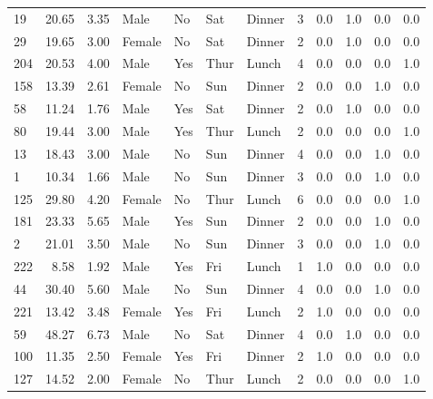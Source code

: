 \documentclass[
  letterpaper,
  DIV=11,
  numbers=noendperiod]{scrreprt}
\begin{document}
\begin{tabular}{lrrllllrrrrr}
19  &       20.65 &  3.35 &    Male &     No &   Sat &  Dinner &     3 &      0.0 &      1.0 &      0.0 &       0.0 \\
29  &       19.65 &  3.00 &  Female &     No &   Sat &  Dinner &     2 &      0.0 &      1.0 &      0.0 &       0.0 \\
204 &       20.53 &  4.00 &    Male &    Yes &  Thur &   Lunch &     4 &      0.0 &      0.0 &      0.0 &       1.0 \\
158 &       13.39 &  2.61 &  Female &     No &   Sun &  Dinner &     2 &      0.0 &      0.0 &      1.0 &       0.0 \\
58  &       11.24 &  1.76 &    Male &    Yes &   Sat &  Dinner &     2 &      0.0 &      1.0 &      0.0 &       0.0 \\
80  &       19.44 &  3.00 &    Male &    Yes &  Thur &   Lunch &     2 &      0.0 &      0.0 &      0.0 &       1.0 \\
13  &       18.43 &  3.00 &    Male &     No &   Sun &  Dinner &     4 &      0.0 &      0.0 &      1.0 &       0.0 \\
1   &       10.34 &  1.66 &    Male &     No &   Sun &  Dinner &     3 &      0.0 &      0.0 &      1.0 &       0.0 \\
125 &       29.80 &  4.20 &  Female &     No &  Thur &   Lunch &     6 &      0.0 &      0.0 &      0.0 &       1.0 \\
181 &       23.33 &  5.65 &    Male &    Yes &   Sun &  Dinner &     2 &      0.0 &      0.0 &      1.0 &       0.0 \\
2   &       21.01 &  3.50 &    Male &     No &   Sun &  Dinner &     3 &      0.0 &      0.0 &      1.0 &       0.0 \\
222 &        8.58 &  1.92 &    Male &    Yes &   Fri &   Lunch &     1 &      1.0 &      0.0 &      0.0 &       0.0 \\
44  &       30.40 &  5.60 &    Male &     No &   Sun &  Dinner &     4 &      0.0 &      0.0 &      1.0 &       0.0 \\
221 &       13.42 &  3.48 &  Female &    Yes &   Fri &   Lunch &     2 &      1.0 &      0.0 &      0.0 &       0.0 \\
59  &       48.27 &  6.73 &    Male &     No &   Sat &  Dinner &     4 &      0.0 &      1.0 &      0.0 &       0.0 \\
100 &       11.35 &  2.50 &  Female &    Yes &   Fri &  Dinner &     2 &      1.0 &      0.0 &      0.0 &       0.0 \\
127 &       14.52 &  2.00 &  Female &     No &  Thur &   Lunch &     2 &      0.0 &      0.0 &      0.0 &       1.0 \\
\bottomrule
\end{tabular}
\end{document}
